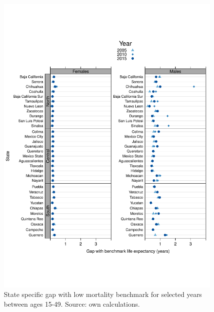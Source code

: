 \documentclass[11.5pt]{article}
\begin{document}
{\begin{figure}
\centering
\caption{State specific gap with low mortality benchmark for selected years between ages 15-49. Source: own calculations.}
\begin{center}
\includegraphics[scale=.8]{Figures/Distance_ya.pdf}
\end{center}
\end{figure}

}
\end{document}
